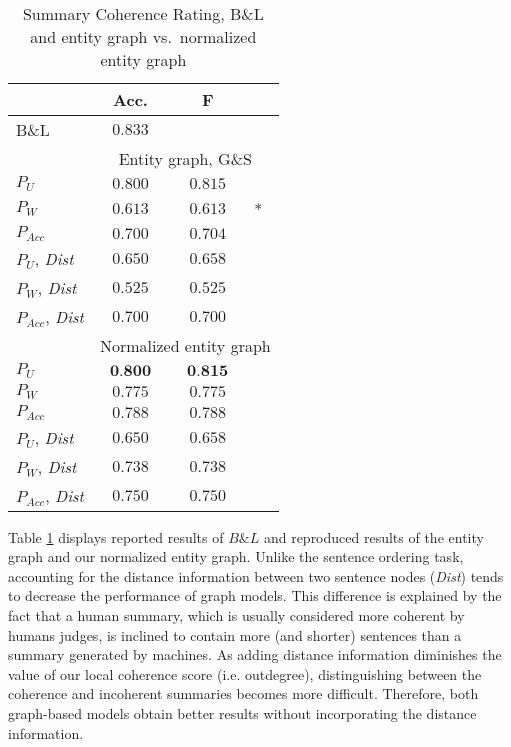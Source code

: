 \begin{table}[!t]
\centering
\begin{small}
\begin{tabular}{l|cc@{}l}
 & Acc. & F  &\\\hline
 B\&L & $0.833$ &  &\\\hline

 & \multicolumn{3}{|c}{Entity graph, G\&S} \\\hline 
$P_U$ & $0.800$ & $0.815$ &  \\
$P_W$ & $0.613$ & $0.613$&* \\
$P_{Acc}$ & $0.700$ & $0.704$& \\  
$P_U$, \textit{Dist} & $0.650$ & $0.658$ \\
$P_W$, \textit{Dist} & $0.525$ & $0.525$  \\
$P_{Acc}$, \textit{Dist} & $0.700$ & $0.700$  \\
\hline 

 & \multicolumn{3}{|c}{Normalized entity graph} \\\hline 
$P_U$ & $\textbf{0.800}$ & $\textbf{0.815}$&  \\
$P_W$ & $0.775$ & $0.775$& \\
$P_{Acc}$ & $0.788$ & $0.788$& \\  
$P_U$, \textit{Dist} & $0.650$ & $0.658$ \\
$P_W$, \textit{Dist} & $0.738$ & $0.738$  \\
$P_{Acc}$, \textit{Dist} & $0.750$ & $0.750$  \\
\end{tabular}
\end{small}
\caption{Summary Coherence Rating, B\&L and entity
  graph vs.\ normalized entity graph}
 \label{table:summary_coherence_ranking}
\end{table}

Table \ref{table:summary_coherence_ranking} displays reported results of $B\&L$ and reproduced results of the entity graph and our normalized entity graph. 
Unlike the sentence ordering task, accounting for the distance information between two sentence nodes (\textit{Dist}) tends to decrease the performance of graph models. 
This difference is explained by the fact that a human summary, which is usually considered more coherent by humans judges, is inclined to contain more (and shorter) sentences than a summary generated by machines. 
As adding distance information diminishes the value of our local coherence score (i.e. outdegree), distinguishing between the coherence and incoherent summaries becomes more difficult. 
Therefore, both graph-based models obtain better results without incorporating the distance information. 


